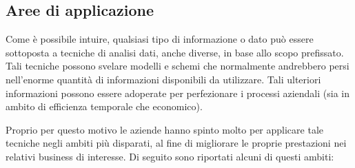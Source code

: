 \subsection{Aree di applicazione}
Come è possibile intuire, qualsiasi tipo di informazione o dato può essere sottoposta a tecniche di analisi dati, anche diverse, in base allo scopo prefissato. Tali tecniche possono svelare modelli e schemi che normalmente andrebbero persi nell'enorme quantità di informazioni disponibili da utilizzare. Tali ulteriori informazioni possono essere adoperate per perfezionare i processi aziendali (sia in ambito di efficienza temporale che economico).\cite{investopedia_data_analytics}

Proprio per questo motivo le aziende hanno spinto molto per applicare tale tecniche negli ambiti più disparati, al fine di migliorare le proprie prestazioni nei relativi business di interesse. Di seguito sono riportati alcuni di questi ambiti:\cite{bigdata4innovation_data_analytics}

